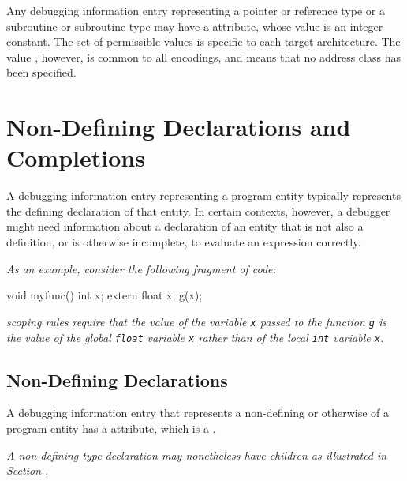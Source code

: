 Any debugging information entry representing a pointer or
reference type or a subroutine or subroutine type may 
have a \DWATaddressclass{}
attribute, whose value is an integer
constant.  The set of permissible values is specific to
each target architecture. The value \DWADDRnoneTARG, however,
is common to all encodings, and means that no address class
has been specified.

\db

\section{Non-Defining Declarations and Completions}
\label{chap:nondefiningdeclarationsandcompletions}
A debugging information entry representing a program entity
typically represents the defining declaration of that
entity. In certain contexts, however, a debugger might need
information about a declaration of an entity that is not
also a definition, or is otherwise incomplete, to evaluate
an\hypertarget{chap:DWATdeclarationincompletenondefiningorseparateentitydeclaration}{}
expression correctly.

\textit{As an example, consider the following fragment of  code:}

\begin{nlnlisting}
void myfunc()
{
  int x;
  {
    extern float x;
    g(x);
  }
}
\end{nlnlisting}


\textit{ scoping rules require that the 
value of the variable \texttt{x} passed to the function 
\texttt{g} is the value of the global \texttt{float} 
variable \texttt{x} rather than of the local \texttt{int} 
variable \texttt{x}.}

\subsection{Non-Defining Declarations}
A debugging information entry that 
represents a non-defining 
or otherwise 
of a program entity has a
\DWATdeclarationDEFN{} attribute, which is a 
.

\textit{A non-defining type declaration may nonetheless have 
children as illustrated in Section
.}


